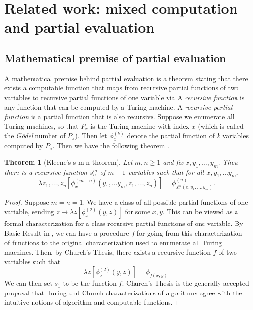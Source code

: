 \documentclass[11pt]{article}
\newtheorem{theorem}{Theorem}
\theoremstyle{definition}
\newcommand\tab[1][1cm]{\hspace*{#1}}
\begin{document}
\section{Related work: mixed computation and partial evaluation}
\subsection{Mathematical premise of partial evaluation}
\tab A mathematical premise behind partial evaluation is a theorem stating that there exists a computable function that maps from recursive partial functions of two variables to recursive partial functions of one variable via 
A \textit{recursive function} is any function that can be computed by a Turing machine. A \textit{recursive partial function} is a partial function that is also recursive.\newline 
\tab Suppose we enumerate all Turing machines, so that $P_x$ is the Turing machine with index $x$ (which is called the \textit{G\"{o}del} number of $P_x$). Then let $\phi_x^{(k)}$ denote the partial function of $k$ variables computed by $P_x$. Then we have the following theorem \cite{rogers1987theory}.
\begin{theorem}[Kleene's s-m-n theorem]
Let $m, n \ge 1$ and fix $x, y_1,\ldots ,y_m$. Then there is a recursive function $s_n^m$ of $m+1$ variables such that for all $x, y_1,\ldots y_m$,
$$\lambda z_1, \ldots ,z_n [\phi_x^{(m+n)}(y_1,\ldots y_m, z_1,\ldots, z_n)] = \phi_{s_n^m(x, y_1,\ldots, y_m)}^{(n)}.$$
\end{theorem}
\begin{proof}
\tab Suppose $m = n = 1$. We have a class of all possible partial functions of one variable, sending $z\mapsto \lambda z [\phi_x^{(2)}(y, z)]$ for some $x, y$. This can be viewed as a formal characterization for a class recursive partial functions of one variable. By Basic Result in \cite{rogers1987theory}, we can have a procedure $f$ for going from this characterization of functions to the original characterization used to enumerate all Turing machines.  Then, by Church's Thesis, there exists a recursive function $f$ of two variables such that $$ \lambda z [\phi_x^{(2)}(y, z)] = \phi_{f(x,y)}.$$ We can then set $s_1$ to be the function $f$. Church's Thesis is the generally accepted proposal that Turing and Church characterizations of algorithms agree with the intuitive notions of algorithm and computable functions.
\end{proof}
\end{document}

